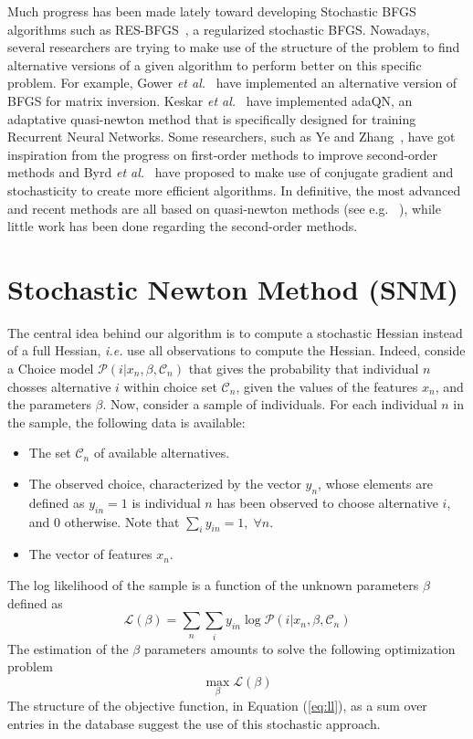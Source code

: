 \documentclass[conference]{IEEEtran}
\begin{document}
Much progress has been made lately toward developing Stochastic BFGS algorithms such as RES-BFGS~\cite{mokhtari_res:_2014}, a regularized stochastic BFGS. Nowadays, several researchers are trying to make use of the structure of the problem to find alternative versions of a given algorithm to perform better on this specific problem. For example, Gower {\it et al.}~\cite{gower_accelerated_2018} have implemented an alternative version of BFGS for matrix inversion. Keskar {\it et al.}~\cite{keskar_adaqn:_2016} have implemented adaQN, an adaptative quasi-newton method that is specifically designed for training Recurrent Neural Networks. Some researchers, such as Ye and Zhang~\cite{ye_nestrovs_2017}, have got inspiration from the progress on first-order methods to improve second-order methods and Byrd {\it et al.}~\cite{byrd_use_2011} have proposed to make use of conjugate gradient and stochasticity to create more efficient algorithms. In definitive, the most advanced and recent methods are all based on quasi-newton methods (see e.g. ~\cite{kiros_training_2013,bordes_sgd-qn:_2009,bordes_erratum:_2010,agarwal_second-order_2016}), while little work has been done regarding the second-order methods.

\section{Stochastic Newton Method (SNM)}
\label{sec:snm}

The central idea behind our algorithm is to compute a stochastic Hessian instead of a full Hessian, {\it i.e.} use all observations to compute the Hessian. Indeed, conside a Choice model $\mathcal{P}(i|x_n, \beta, \mathcal{C}_n)$ that gives the probability that individual $n$ chosses alternative $i$ within choice set $\mathcal{C}_n$, given the values of the features $x_n$, and the parameters $\beta$. Now, consider a sample of individuals. For each individual $n$ in the sample, the following data is available:
\begin{itemize}
\item The set $\mathcal{C}_n$ of available alternatives.
\item The observed choice, characterized by the vector $y_n$, whose elements are defined as $y_{in}=1$ is individual $n$ has been observed to choose alternative $i$, and 0 otherwise. Note that $\sum_{i} y_{in} = 1, \;\forall n$.
\item The vector of features $x_n$.
\end{itemize}
The log likelihood of the sample is a function of the unknown parameters $\beta$ defined as 
\begin{equation}
\label{eq:ll}
\mathcal{L}(\beta) = \sum_n \sum_i y_{in} \log \mathcal{P}(i|x_n, \beta, \mathcal{C}_n)
\end{equation}
The estimation of the $\beta$ parameters amounts to solve the following optimization problem
\begin{equation}
\label{eq:opt}
\max_{\beta} \mathcal{L}(\beta)
\end{equation} 
The structure of the objective function, in Equation (\ref{eq:ll}), as a sum over entries in the database suggest the use of this stochastic approach.
\end{document}
